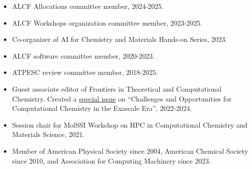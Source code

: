 \begin{itemize}
    \item ALCF Allocations committee member, 2024-2025.
    \item ALCF Workshops organization committee member, 2023-2025.
    \item Co-organizer of AI for Chemistry and Materials Hands-on Series, 2023.
    \item ALCF software committee member, 2020-2023.
    \item ATPESC review committee member, 2018-2025.
    \item Guest associate editor of Frontiers in Theoretical and Computational Chemistry. Created a \href{https://www.frontiersin.org/research-topics/35814/challenges-and-opportunities-for-computational-chemistry-in-the-exascale-era}{special issue} on “Challenges and Opportunities for Computational Chemistry in the Exascale Era”, 2022-2024.
    \item Session chair for MolSSI Workshop on HPC in Computational Chemistry and Materials Science, 2021.
    \item Member of American Physical Society since 2004, American Chemical Society since 2010, and Association for Computing Machinery since 2023.
\end{itemize}

